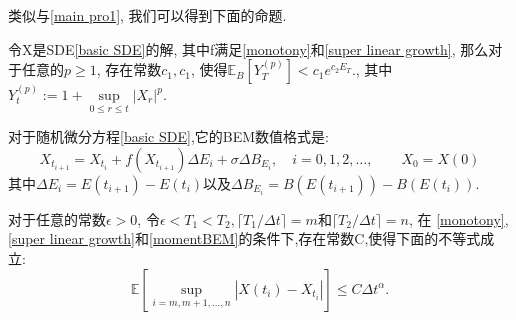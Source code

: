 类似与\cref{main pro1}, 我们可以得到下面的命题.
\begin{proposition}\label{main pro2}
	令X是SDE\cref{basic SDE}的解, 其中f满足\cref{monotony}和\cref{super linear growth}, 那么对于任意的$p \ge 1$, 存在常数$c_1,c_1$, 使得$\mathbb{E}_{B}[Y_T^{(p)}] < c_1 e^{c_2E_T }. $, 其中$Y_t^{(p)} := 1 + \sup\limits_{0\le r\le t}|X_r|^p$.
\end{proposition}

对于随机微分方程\cref{basic SDE},它的BEM数值格式是:
\begin{equation}\label{eq:1}
	X_{t_{i+1}}=X_{t_i}+f(X_{t_{i+1}})\Delta E_{i}+\sigma\Delta B_{E_{i}},\quad i=0,1,2,\ldots,\qquad X_0=X(0)
\end{equation}
其中$\Delta E_{i}=E(t_{i+1})-E(t_i)$以及$\Delta B_{E_{i}}=B(E{(t_{i+1})})-B(E({t_i}))$.
\begin{theorem}\label{main th}
	对于任意的常数$\epsilon>0$, 令$\epsilon < T_1 < T_2, \lceil T_1/\Delta t \rceil = m$和$\lceil T_2/\Delta t \rceil = n$, 在 \cref{monotony}, \cref{super linear growth}和\cref{momentBEM}的条件下,存在常数C,使得下面的不等式成立:
	$$\mathbb{E}\left[\sup\limits_{i = m,m+1,\ldots,n} |X({t_i})-X_{t_i}|\right]\le C\Delta t^\alpha.$$
\end{theorem}
